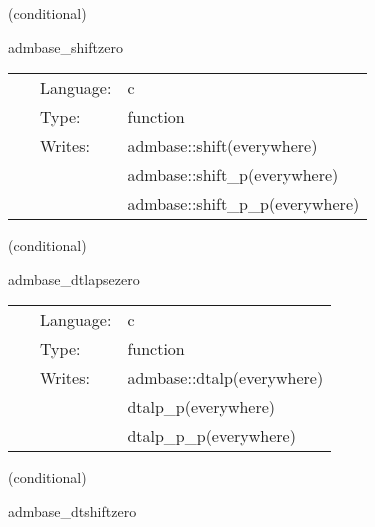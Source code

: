 \vspace{5mm}

   (conditional) 

\hspace{5mm} admbase\_shiftzero 

\hspace{5mm}{\it set the shift to 0 at all points } 


\hspace{5mm}

 \begin{tabular*}{160mm}{cll} 
~ & Language:  & c \\ 
~ & Type:  & function \\ 
~ & Writes:  & admbase::shift(everywhere) \\ 
~& ~ &admbase::shift\_p(everywhere)\\ 
~& ~ &admbase::shift\_p\_p(everywhere)\\ 
\end{tabular*} 


\vspace{5mm}

   (conditional) 

\hspace{5mm} admbase\_dtlapsezero 

\hspace{5mm}{\it set the dtlapse to 0 at all points } 


\hspace{5mm}

 \begin{tabular*}{160mm}{cll} 
~ & Language:  & c \\ 
~ & Type:  & function \\ 
~ & Writes:  & admbase::dtalp(everywhere) \\ 
~& ~ &dtalp\_p(everywhere)\\ 
~& ~ &dtalp\_p\_p(everywhere)\\ 
\end{tabular*} 


\vspace{5mm}

   (conditional) 

\hspace{5mm} admbase\_dtshiftzero 

\hspace{5mm}{\it set the dtshift to 0 at all points } 


\hspace{5mm}

